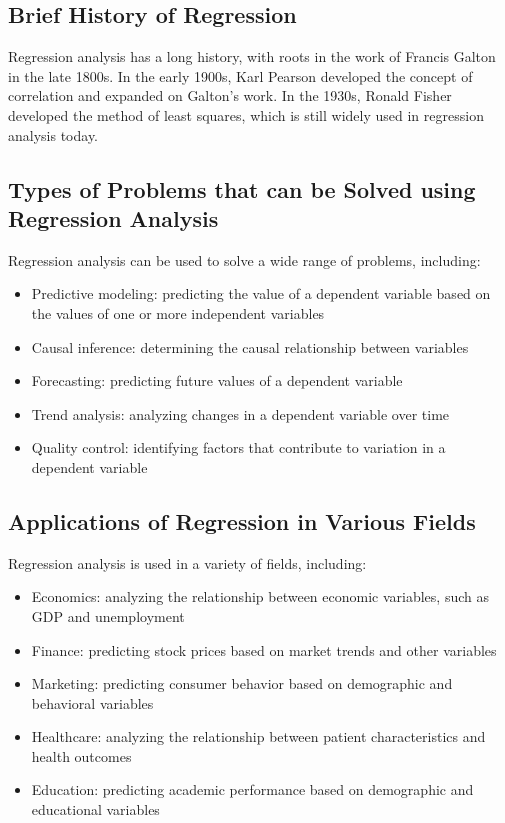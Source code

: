 \documentclass{article}
\begin{document}
\subsection{Brief History of Regression}

Regression analysis has a long history, with roots in the work of Francis Galton in the late 1800s. In the early 1900s, Karl Pearson developed the concept of correlation and expanded on Galton's work. In the 1930s, Ronald Fisher developed the method of least squares, which is still widely used in regression analysis today.

\subsection{Types of Problems that can be Solved using Regression Analysis}

Regression analysis can be used to solve a wide range of problems, including:

\begin{itemize}
\item Predictive modeling: predicting the value of a dependent variable based on the values of one or more independent variables
\item Causal inference: determining the causal relationship between variables
\item Forecasting: predicting future values of a dependent variable
\item Trend analysis: analyzing changes in a dependent variable over time
\item Quality control: identifying factors that contribute to variation in a dependent variable
\end{itemize}

\subsection{Applications of Regression in Various Fields}

Regression analysis is used in a variety of fields, including:

\begin{itemize}
\item Economics: analyzing the relationship between economic variables, such as GDP and unemployment
\item Finance: predicting stock prices based on market trends and other variables
\item Marketing: predicting consumer behavior based on demographic and behavioral variables
\item Healthcare: analyzing the relationship between patient characteristics and health outcomes
\item Education: predicting academic performance based on demographic and educational variables
\end{itemize}
\end{document}
